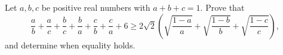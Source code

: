 Let $a,b,c$ be positive real numbers with $a+b+c=1$. Prove that
\[\dfrac ab+\dfrac ac+\dfrac bc+\dfrac ba+\dfrac cb+\dfrac ca+6\ge2\sqrt2\left(\sqrt{\dfrac{1-a}{a}}+\sqrt{\dfrac{1-b}{b}}+\sqrt{\dfrac{1-c}{c}}\right),\]
and determine when equality holds.
